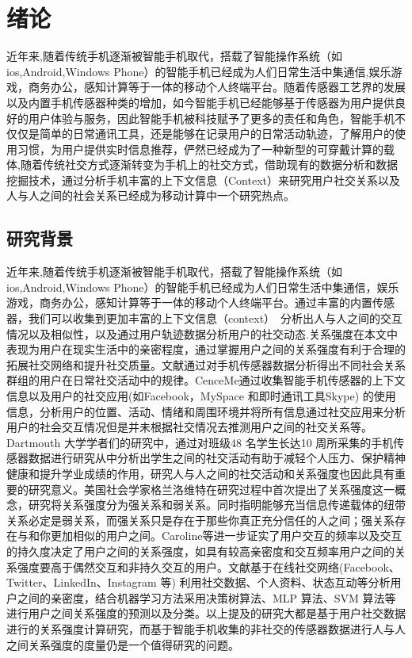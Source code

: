 \chapter{绪论}
近年来,随着传统手机逐渐被智能手机取代，搭载了智能操作系统（如ios,Android,Windows Phone）的智能手机已经成为人们日常生活中集通信,娱乐游戏，商务办公，感知计算等于一体的移动个人终端平台。随着传感器工艺界的发展以及内置手机传感器种类的增加，如今智能手机已经能够基于传感器为用户提供良好的用户体验与服务，因此智能手机被科技赋予了更多的责任和角色，智能手机不仅仅是简单的日常通讯工具，还是能够在记录用户的日常活动轨迹，了解用户的使用习惯，为用户提供实时信息推荐，俨然已经成为了一种新型的可穿戴计算的载体,随着传统社交方式逐渐转变为手机上的社交方式，借助现有的数据分析和数据挖掘技术，通过分析手机丰富的上下文信息（Context）来研究用户社交关系以及人与人之间的社会关系已经成为移动计算中一个研究热点。

\section{研究背景}

近年来,随着传统手机逐渐被智能手机取代，搭载了智能操作系统（如ios,Android,Windows Phone）的智能手机已经成为人们日常生活中集通信，娱乐游戏，商务办公，感知计算等于一体的移动个人终端平台。通过丰富的内置传感器，我们可以收集到更加丰富的上下文信息（context）　分析出人与人之间的交互情况以及相似性，以及通过用户轨迹数据分析用户的社交动态.关系强度在本文中表现为用户在现实生活中的亲密程度，通过掌握用户之间的关系强度有利于合理的拓展社交网络和提升社交质量。文献\cite{eagle2006reality}通过对手机传感器数据分析得出不同社会关系群组的用户在日常社交活动中的规律。CenceMe通过收集智能手机传感器的上下文信息以及用户的社交应用(如Facebook，MySpace 和即时通讯工具Skype) 的使用信息，分析用户的位置、活动、情绪和周围环境并将所有信息通过社交应用来分析用户的社会交互情况但是并未根据社交情况去推测用户之间的社交关系等。Dartmouth 大学学者们的研究中，通过对班级48 名学生长达10 周所采集的手机传感器数据进行研究从中分析出学生之间的社交活动有助于减轻个人压力、保护精神健康和提升学业成绩的作用，研究人与人之间的社交活动和关系强度也因此具有重要的研究意义。美国社会学家格兰洛维特在研究过程中首次提出了关系强度这一概念，研究将关系强度分为强关系和弱关系。同时指明能够充当信息传递载体的纽带关系必定是弱关系，而强关系只是存在于那些你真正充分信任的人之间；强关系存在与和你更加相似的用户之间。Caroline等进一步证实了用户交互的频率以及交互的持久度决定了用户之间的关系强度，如具有较高亲密度和交互频率用户之间的关系强度要高于偶然交互和非持久交互的用户。文献\cite{gustafson2012extracting,khadangi2013measuring,zhao2012relationship}基于在线社交网络(Facebook、Twitter、LinkedIn、Instagram 等) 利用社交数据、个人资料、状态互动等分析用户之间的亲密度，结合机器学习方法采用决策树算法、MLP 算法、SVM 算法等进行用户之间关系强度的预测以及分类。以上提及的研究大都是基于用户社交数据进行的关系强度计算研究，而基于智能手机收集的非社交的传感器数据进行人与人之间关系强度的度量仍是一个值得研究的问题。

